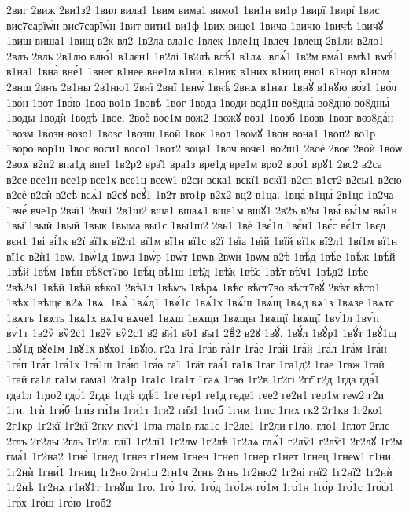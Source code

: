 {2виг
2виж
2ви1з2
1вил
вила1
1вим
вима1
вимо1
1ви1н
ви1р
1вирї
1вирї
1вис
вис7сарїѡ́н
вис7сарїѡ́н
1вит
вити1
ви1ф
1вих
вице1
1вича
1вичю
1вичѣ
1вичꙋ
1виш
виша1
1вищ
в2к
вл2
1в2ла
вла1с
1влек
1вле1ц
1влеч
1влещ
2в1ли
в2ло1
2влъ
2вль
2в1лю
влю́1
в1лєн1
1в2лі
1в2лѣ
влѣ́1
в1лѧ.
влѧ́1
1в2м
вма́1
вмѣ1
вмѣ́1
в1на1
1вна̀
вне́1
1внег
в1нее
вне1м
в1ни.
в1ник
в1них
в1ниц
вно1
в1нод
в1ном
2внш
2внъ
2в1ны
2в1ню1
2внї
2внї
1внѡ́
1внѣ̀
2внѧ
в1нѧг
1внꙋ̀
в1нꙋю
во́з1
1во́л
1во́н
1во́т
1во́ю
1воа
во1в
1вовѣ
1вог
1вода
1води
вод1н
во8дна́
во8дно́
во8дны́
1воды
1водѝ
1водѣ
1вое.
2воѐ
вое1м
вож2
1вожꙋ
воз1
1возб
1возв
1возг
воз8да́н
1возм
1возн
возо1
1возс
1возш
1вой
1вок
1вол
1вомꙋ
1вон
вона1
1воп2
во1р
1воро
вор1ц
1вос
воси1
восо1
1вот2
воца1
1воч
воче1
во2ш1
2воѐ
2воє
2воѝ
1воѡ
2воѧ
в2п2
впа1д
впе1
1в2р2
вра̑1
вра1з
вре1д
вре1м
вро2
вро́1
врꙋ1
2вс2
в2са
в2се
все1н
все1р
все1х
все1ц
всеѡ1
в2си
вска1
вскї1
вскї1
в2сп
в1ст2
в2сы1
в2сю
в2сѐ
в2сѝ
в2сѣ
всѧ́1
в2сꙋ
всꙋ́1
1в2т
вто1р
в2х2
вц2
в1ца.
1вца́
в1цы̀
2в1цє
1в2ча
1вче́
вче1р
2вчї1
2вчї1
2в1ш2
вша1
вшаѧ1
вше1м
вшꙋ1
2в2ъ
в2ы
1вы́
вы́1м
вы́1н
1вы̑
1вый
1вый
1вык
1выма
вы1с
1вы1ш2
2вь1
1вѐ
1вє́1л
1вє́н1
1вє́с
вє́1т
1вєд
вєн1
1ві
ві́1к
в2ї
вї1к
вї2л1
вї1м
вї1н
вї1с
в2ї
1вїа
1вїй
1вїй
вї1к
вї2л1
1вї1м
вї1н
вї1с
в2ѝ1
1вѡ.
1вѡ́1д
1вѡ́л
1вѡ́р
1вѡ́т
1вѡв
2вѡи
1вѡм
в2ѣ
1вѣ́д
1вѣ́е
1вѣ́ж
1вѣ́й
1вѣ́й
1вѣ́м
1вѣ́н
вѣ́8ст7во
1вѣ́ц
вѣ́1ш
1вѣ̑д
1вѣ̑к
1вѣ̑с
1вѣ̑т
вѣ̑ч1
1вѣд2
1вѣе
2вѣ2з1
1вѣй
1вѣй
вѣко1
2вѣ1л
1вѣмъ
1вѣрѧ
1вѣс
вѣст7во
вѣст7вꙋ́
2вѣт
вѣто1
1вѣх
1вѣщє
в2ѧ
1вѧ.
1вѧ̀
1вѧ́д1
1вѧ́1с
1вѧ́1х
1вѧ́ш
1вѧ́щ
1вѧд
вѧ1з
1вѧзе
1вѧтс
1вѧтъ
1вѧть
1вѧ1х
вѧ1ч
вѧче1
1вѧш
1вѧщи
1вѧщы
1вѧщї
1вѧщї
1вѵ́1л
1вѵ́п
вѵ́1т
1в2ѷ
вѷ2с1
1в2ѷ
вѷ2с1
в҃2
в҃и́1
в҃о1
в҃ы1
2вⷣ2
в2ꙋ
1вꙋ́.
1вꙋ́л
1вꙋ́р1
1вꙋ́т
1вꙋ́1щ
1вꙋ1д
вꙋе1м
1вꙋ1х
вꙋхо1
1вꙋю.
г2а
1га̀
1га́в
га́1г
1га́е
1га́й
1га́й
1га́л
1га́м
1га́н
1га́п
1га́т
1га́1х
1га́1ш
1га́ю
1га́ѳ
га̑1
1га̑т
гаа́1
га1в
1гаг
1га1д2
1гае
1гаж
1гай
1гай
га1л
га1м
гама1
2га1р
1га1с
1га1т
1гаѧ
1гаѳ
1г2в
1г2гі
2гг҃
г2д
1гда
гда́1
гда1л
1гдо2
гдо́1
2гдъ
1гдѣ
гдѣ́1
1ге
ге́р1
ге1д
геде1
гее2
ге2н1
гер1м
геѡ2
г2и
1ги.
1гѝ
1ги́б
1ги́з
ги́1н
1ги́1т
1ги̑2
ги̑з1
1гиб
1гим
1гис
1гих
гк2
2г1кв
1г2ко1
2г1кр
1г2кї
1г2кї
2гкѵ
гкѵ́1
1гла
гла1в
гла1с
1г2ле1
1г2ли
г1ло.
гло́1
1глот
2глс
2глъ
2г2лы
2гль
1г2лі
глї1
1г2лї1
1г2лѡ
1г2лѣ
1г2лѧ
глѧ́1
г2лѷ1
г2лѷ1
2г2лꙋ
1г2м
гма́1
1г2на2
1гне́
1гнед
1гнез
г1нем
1гнен
1гнеп
1гнер
г1нет
1гнец
1гнеѡ1
г1ни.
1г2нѝ
1гни́1
1гниц
1г2но
2гн1ц
2гн1ч
2гнъ
2гнь
1г2ню2
1г2ні
гнї2
1г2нї2
1г2нѝ
1г2нѣ
1г2нѧ
г1нꙋ1т
1гнꙋш
1го.
1го̀
1го́.
1го́д
1го́1ж
го́1м
1го́1н
1го́р
1го́1с
1го́ф1
1го́х
1го́ш
1го́ю
1гоб2
}
